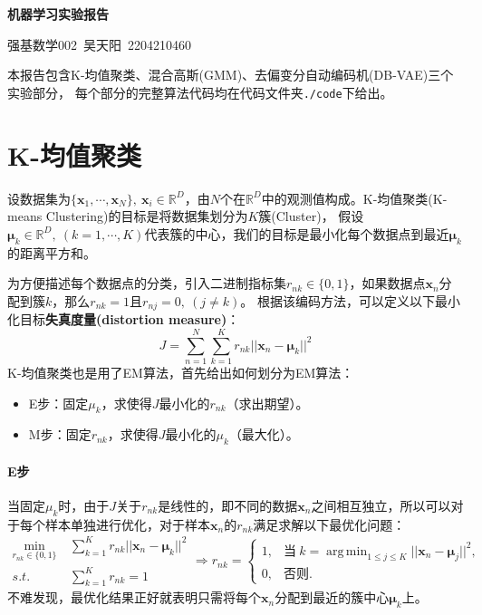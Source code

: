 \documentclass[12pt, a4paper, oneside]{ctexart}
\newenvironment{myTitle}[1]{
    \begin{center}
    {\zihao{-2}\bf #1\\}
    \zihao{-4}\it
}{\end{center}}  %
\DeclareMathOperator*{\argmin}{arg\,min}  %
\let\leq=\leqslant %
\def\bd{\boldsymbol}        %
\def\R{\mathbb{R}}          %
\begin{document}
\clearpage
\begin{myTitle}{机器学习实验报告}
    强基数学002\ 吴天阳\ 2204210460
\end{myTitle}
本报告包含K-均值聚类、混合高斯(GMM)、去偏变分自动编码机(DB-VAE)三个实验部分，
每个部分的完整算法代码均在代码文件夹\texttt{./code}下给出。
\section{K-均值聚类}
设数据集为$\{\bd{x}_1,\cdots,\bd{x}_N\},\ \bd{x}_i\in\R^D$，由$N$个在$\R^D$中的观测值构成。K-均值聚类(K-means Clustering)的目标是将数据集划分为$K$簇(Cluster)，
假设$\bd{\mu}_k\in\R^D,\ (k=1,\cdots,K)$代表簇的中心，我们的目标是最小化每个数据点到最近$\bd{\mu}_k$的距离平方和。

为方便描述每个数据点的分类，引入二进制指标集$r_{nk}\in\{0,1\}$，如果数据点$\bd{x}_n$分配到簇$k$，那么$r_{nk} = 1$且$r_{nj}=0,\ (j\neq k)$。
根据该编码方法，可以定义以下最小化目标\textbf{失真度量(distortion measure)}：
\begin{equation}\label{eq-kmeansJ}
    J = \sum_{n=1}^N\sum_{k=1}^Kr_{nk}||\bd{x}_n-\bd{\mu}_k||^2
\end{equation}
K-均值聚类也是用了EM算法，首先给出如何划分为EM算法：
\begin{itemize}
    \item E步：固定$\mu_k$，求使得$J$最小化的$r_{nk}$（求出期望）。
    \item M步：固定$r_{nk}$，求使得$J$最小化的$\mu_k$（最大化）。
\end{itemize}
\paragraph{E步}当固定$\mu_k$时，由于$J$关于$r_{nk}$是线性的，即不同的数据$\bd{x}_n$之间相互独立，所以可以对于每个样本单独进行优化，对于样本$\bd{x}_n$的$r_{nk}$满足求解以下最优化问题：
\begin{equation*}
    \begin{aligned}
        \min_{r_{nk}\in\{0,1\}}&\ \sum_{k=1}^Kr_{nk}||\bd{x}_n-\bd{\mu}_k||^2\\
        s.t.&\ \sum_{k=1}^Kr_{nk} = 1
    \end{aligned}\Rightarrow r_{nk} = \begin{cases}
        1, &\text{当}\ k=\argmin_{1\leq j\leq K}||\bd{x}_n-\bd{\mu}_j||^2,\\
        0, &\text{否则}.
    \end{cases}
\end{equation*}
不难发现，最优化结果正好就表明只需将每个$\bd{x}_n$分配到最近的簇中心$\bd{\mu}_k$上。
\end{document}
